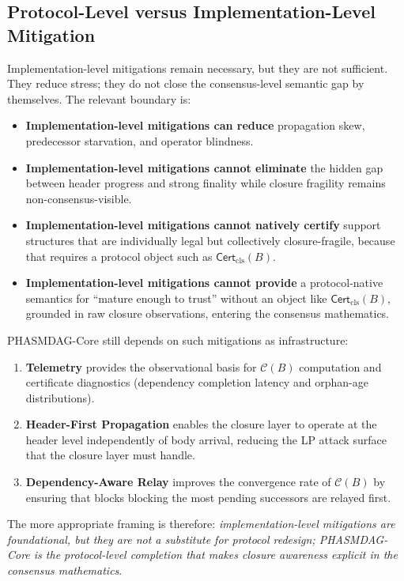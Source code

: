 \documentclass[11pt]{article}
\theoremstyle{definition}
\theoremstyle{plain}
\theoremstyle{remark}
\newcommand{\Clvl}{\mathcal{C}}          %
\newcommand{\Certcls}{\mathsf{Cert}_{\mathrm{cls}}}
\begin{document}
\subsection{Protocol-Level versus Implementation-Level Mitigation}

Implementation-level mitigations remain necessary, but they are not sufficient.
They reduce stress; they do not close the consensus-level semantic gap by
themselves.
The relevant boundary is:
\begin{itemize}[nosep]
    \item \textbf{Implementation-level mitigations can reduce} propagation skew,
    predecessor starvation, and operator blindness.
    \item \textbf{Implementation-level mitigations cannot eliminate} the hidden gap
    between header progress and strong finality while closure fragility remains
    non-consensus-visible.
    \item \textbf{Implementation-level mitigations cannot natively certify} support
    structures that are individually legal but collectively closure-fragile,
    because that requires a protocol object such as $\Certcls(B)$.
    \item \textbf{Implementation-level mitigations cannot provide} a protocol-native
    semantics for ``mature enough to trust'' without an object like
    $\Certcls(B)$, grounded in raw closure observations, entering the
    consensus mathematics.
\end{itemize}

PHASMDAG-Core still depends on such mitigations as infrastructure:
\begin{enumerate}[nosep]
    \item \textbf{Telemetry} provides the observational basis for $\Clvl(B)$
    computation and certificate diagnostics (dependency completion latency and
    orphan-age distributions).
    \item \textbf{Header-First Propagation} enables the closure layer to
    operate at the header level independently of body arrival, reducing the
    LP attack surface that the closure layer must handle.
    \item \textbf{Dependency-Aware Relay} improves the convergence rate of
    $\Clvl(B)$ by ensuring that blocks blocking the most pending successors
    are relayed first.
\end{enumerate}

The more appropriate framing is therefore: \emph{implementation-level mitigations are
foundational, but they are not a substitute for protocol redesign;
PHASMDAG-Core is the protocol-level completion that makes closure awareness explicit
in the consensus mathematics}.
\end{document}
